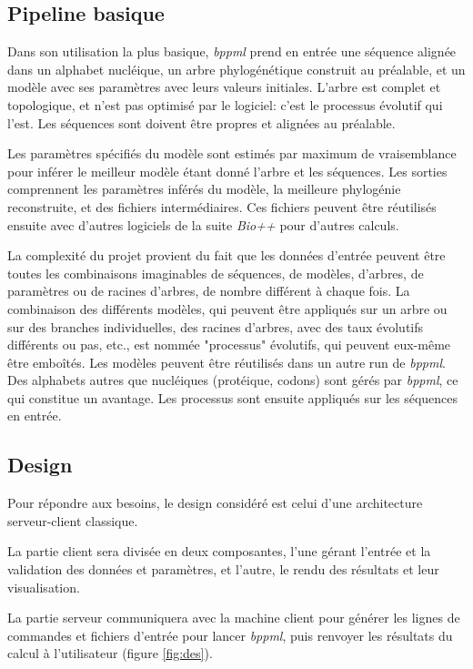 \subsection{Pipeline basique}

Dans son utilisation la plus basique,
\textit{bppml} prend en entrée une séquence alignée dans un alphabet nucléique,
un arbre phylogénétique construit au préalable,
et un modèle avec ses paramètres
avec leurs valeurs initiales.
L'arbre est complet et topologique,
et n'est pas optimisé par le logiciel:
c'est le processus évolutif qui l'est.
Les séquences sont doivent être propres et alignées au préalable.

Les paramètres spécifiés du modèle sont estimés par maximum de vraisemblance
pour inférer le meilleur modèle étant donné l'arbre et les séquences.
Les sorties comprennent les paramètres inférés du modèle,
la meilleure phylogénie reconstruite,
et des fichiers intermédiaires.
Ces fichiers peuvent être réutilisés ensuite
avec d'autres logiciels de la suite \textit{Bio++}
pour d'autres calculs.

La complexité du projet provient du fait que les données d'entrée
peuvent être toutes les combinaisons imaginables
de séquences, de modèles, d'arbres, de paramètres ou de racines d'arbres,
de nombre différent à chaque fois.
La combinaison des différents modèles,
qui peuvent être appliqués sur un arbre ou sur des branches individuelles,
des racines d'arbres,
avec des taux évolutifs différents ou pas, etc.,
est nommée "processus" évolutifs,
qui peuvent eux-même être emboîtés.
Les modèles peuvent être réutilisés
dans un autre run de \textit{bppml}.
Des alphabets autres que nucléiques (protéique, codons) sont gérés par \textit{bppml}, ce qui constitue un avantage.
Les processus sont ensuite appliqués sur les séquences en entrée.


\subsection{Design}

Pour répondre aux besoins,
le design considéré est celui d'une architecture serveur-client classique.

La partie client sera divisée en deux composantes,
l'une gérant l'entrée et la validation des données et paramètres,
et l'autre, le rendu des résultats et leur visualisation.

La partie serveur communiquera avec la machine client
pour générer les lignes de commandes et fichiers d'entrée
pour lancer \textit{bppml},
puis renvoyer les résultats du calcul à l'utilisateur (figure \ref{fig:des}).

